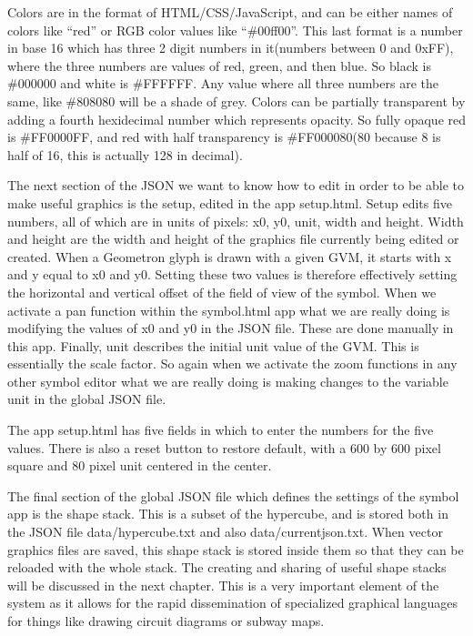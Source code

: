 Colors are in the format of HTML/CSS/JavaScript, and can be either names of colors like ``red'' or RGB color values like ``\#00ff00''.  This last format is a number in base 16 which has three 2 digit numbers in it(numbers between 0 and 0xFF), where the three numbers are values of red, green, and then blue.  So black is \#000000 and white is \#FFFFFF.  Any value where all three numbers are the same, like \#808080 will be a shade of grey.   Colors can be partially transparent by adding a fourth hexidecimal number which represents opacity.  So fully opaque red is \#FF0000FF, and red with half transparency is \#FF000080(80 because 8 is half of 16, this is actually 128 in decimal).

The next section of the JSON we want to know how to edit in order to be able to make useful graphics is the setup, edited in the app setup.html.  Setup edits five numbers, all of which are in units of pixels: x0, y0, unit, width and height.  Width and height are the width and height of the graphics file currently being edited or created.  When a Geometron glyph is drawn with a given GVM, it starts with x and y equal to x0 and y0. Setting these two values is therefore effectively setting the horizontal and vertical offset of the field of view of the symbol.  When we activate a pan function within the symbol.html app what we are really doing is modifying the values of x0 and y0 in the JSON file.  These are done manually in this app.  Finally, unit describes the initial unit value of the GVM.  This is essentially the scale factor.  So again when we activate the zoom functions in any other symbol editor what we are really doing is making changes to the variable unit in the global JSON file.    

The app setup.html has five fields in which to enter the numbers for the five values. There is also a reset button to restore default, with a 600 by 600 pixel square and 80 pixel unit centered in the center.  

The final section of the global JSON file which defines the settings of the symbol app is the shape stack.  This is a subset of the hypercube, and is stored both in the JSON file data/hypercube.txt and also data/currentjson.txt.  When vector graphics files are saved, this shape stack is stored inside them so that they can be reloaded with the whole stack.  The creating and sharing of useful shape stacks will be discussed in the next chapter.  This is a very important element of the system as it allows for the rapid dissemination of specialized graphical languages for things like drawing circuit diagrams or subway maps.

